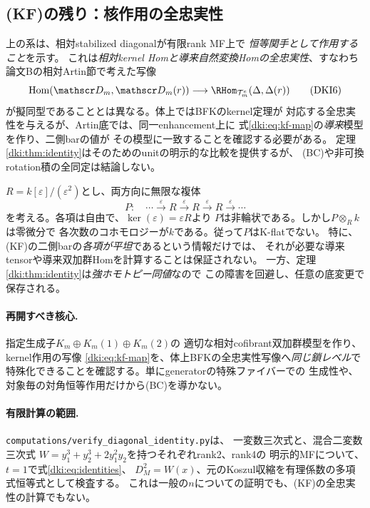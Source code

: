 \subsection{(KF)の残り：核作用の全忠実性}

\begin{remark}[恒等作用とkernel全忠実性の相違]\label{dki:rem:kf}
上の系は、相対stabilized diagonalが有限rank MF上で
\emph{恒等関手として作用すること}を示す。
これは\emph{相対kernel Homと導来自然変換Homの全忠実性}、すなわち
論文Bの相対Artin節で考えた写像
\[
 \operatorname{Hom}(\mathscr D_m,\mathscr D_m(r))
 \longrightarrow
 \RHom_{\mathcal T_m^e}(\Delta,\Delta(r))
 \tag{DKI6}\label{dki:eq:kf-map}
\]
が擬同型であることとは異なる。体上ではBFKのkernel定理が
対応する全忠実性を与えるが、Artin底では、同一enhancement上に
式\eqref{dki:eq:kf-map}の\emph{導来}模型を作り、二側barの値が
その模型に一致することを確認する必要がある。
定理\ref{dki:thm:identity}はそのためのunitの明示的な比較を提供するが、
(BC)や非可換rotation積の全同定は結論しない。
\end{remark}

\begin{example}
\label{dki:ex:kflat}
$R=k[\varepsilon]/(\varepsilon^2)$とし、両方向に無限な複体
\[
 P:\quad\cdots\xrightarrow{\varepsilon}R
 \xrightarrow{\varepsilon}R\xrightarrow{\varepsilon}R\xrightarrow{\varepsilon}\cdots
\]
を考える。各項は自由で、$\ker(\varepsilon)=\varepsilon R$より
$P$は非輪状である。しかし$P\otimes_Rk$は零微分で
各次数のコホモロジーが$k$である。従って$P$はK-flatでない。
特に、(KF)の二側barの\emph{各項が平坦}であるという情報だけでは、
それが必要な導来tensorや導来双加群Homを計算することは保証されない。
一方、定理\ref{dki:thm:identity}は\emph{強ホモトピー同値}なので
この障害を回避し、任意の底変更で保存される。
\end{example}

\paragraph{再開すべき核心.}
指定生成子$K_m\oplus K_m(1)\oplus K_m(2)$の
適切な相対cofibrant双加群模型を作り、kernel作用の写像
\eqref{dki:eq:kf-map}を、体上BFKの全忠実性写像へ\emph{同じ鎖レベル}で
特殊化できることを確認する。単にgeneratorの特殊ファイバーでの
生成性や、対象毎の対角恒等作用だけから(BC)を導かない。

\paragraph{有限計算の範囲.}
\texttt{computations/verify\_diagonal\_identity.py}は、
一変数三次式と、混合二変数三次式
$W=y_1^3+y_2^3+2y_1^2y_2$を持つそれぞれrank2、rank4の
明示的MFについて、$t=1$で式\eqref{dki:eq:identities}、
$D_M^2=W(x)$、元のKoszul収縮を有理係数の多項式恒等式として検査する。
これは一般の$n$についての証明でも、(KF)の全忠実性の計算でもない。
